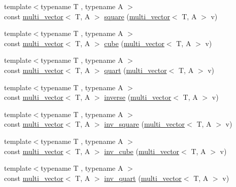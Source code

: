 \begin{DoxyCompactItemize}
\item 
{\footnotesize template$<$typename T , typename A $>$ }\\const \hyperlink{classIceBRG_1_1multi__vector}{multi\-\_\-vector}$<$ T, A $>$ \hyperlink{namespaceIceBRG_a12901d9ef42c183e7268f4334a95628b}{square} (\hyperlink{classIceBRG_1_1multi__vector}{multi\-\_\-vector}$<$ T, A $>$ v)
\item 
{\footnotesize template$<$typename T , typename A $>$ }\\const \hyperlink{classIceBRG_1_1multi__vector}{multi\-\_\-vector}$<$ T, A $>$ \hyperlink{namespaceIceBRG_a44985542dda9e074751a55cc354bfc38}{cube} (\hyperlink{classIceBRG_1_1multi__vector}{multi\-\_\-vector}$<$ T, A $>$ v)
\item 
{\footnotesize template$<$typename T , typename A $>$ }\\const \hyperlink{classIceBRG_1_1multi__vector}{multi\-\_\-vector}$<$ T, A $>$ \hyperlink{namespaceIceBRG_af10adb416b6990751b8a95a59ee16f12}{quart} (\hyperlink{classIceBRG_1_1multi__vector}{multi\-\_\-vector}$<$ T, A $>$ v)
\item 
{\footnotesize template$<$typename T , typename A $>$ }\\const \hyperlink{classIceBRG_1_1multi__vector}{multi\-\_\-vector}$<$ T, A $>$ \hyperlink{namespaceIceBRG_a530690fc21a37b60c129ced409bceaa5}{inverse} (\hyperlink{classIceBRG_1_1multi__vector}{multi\-\_\-vector}$<$ T, A $>$ v)
\item 
{\footnotesize template$<$typename T , typename A $>$ }\\const \hyperlink{classIceBRG_1_1multi__vector}{multi\-\_\-vector}$<$ T, A $>$ \hyperlink{namespaceIceBRG_a0c6241d2692d5628797728af2efd0c0f}{inv\-\_\-square} (\hyperlink{classIceBRG_1_1multi__vector}{multi\-\_\-vector}$<$ T, A $>$ v)
\item 
{\footnotesize template$<$typename T , typename A $>$ }\\const \hyperlink{classIceBRG_1_1multi__vector}{multi\-\_\-vector}$<$ T, A $>$ \hyperlink{namespaceIceBRG_a327fa8b9cb72205f2d07d21cad508feb}{inv\-\_\-cube} (\hyperlink{classIceBRG_1_1multi__vector}{multi\-\_\-vector}$<$ T, A $>$ v)
\item 
{\footnotesize template$<$typename T , typename A $>$ }\\const \hyperlink{classIceBRG_1_1multi__vector}{multi\-\_\-vector}$<$ T, A $>$ \hyperlink{namespaceIceBRG_a66e21644cb97134df27c37f6b17ff847}{inv\-\_\-quart} (\hyperlink{classIceBRG_1_1multi__vector}{multi\-\_\-vector}$<$ T, A $>$ v)
\item 

\end{DoxyCompactItemize}
